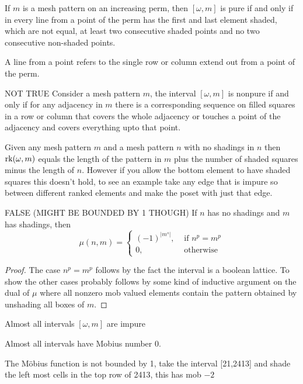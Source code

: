 \documentclass[11pt,a4paper,oneside]{article}
\begin{document}
\begin{conj}
If $m$ is a mesh pattern on an increasing perm, then $[\omega,m]$ is pure if and only if in every line from a point of the perm has the first and last element shaded, which are not equal, at least two consecutive shaded points and no two consecutive non-shaded points. 
\end{conj}

A line from a point refers to the single row or column extend out from a point of the perm.

\begin{conj}NOT TRUE
Consider a mesh pattern $m$, the interval $[\omega,m]$ is nonpure if and only if for any adjacency in $m$ there is a corresponding sequence on filled squares in a row or column that covers the whole adjacency or touches a point of the adjacency and covers everything upto that point.
\end{conj}


Given any mesh pattern $m$ and a mesh pattern $n$ with no shadings in $n$ then $\operatorname{\textrm{rk}}(\omega,m)$ equals the length of the pattern in $m$ plus the number of shaded squares minus the length of $n$. However if you allow the bottom element to have shaded squares this doesn't hold, to see an example take any edge that is impure so between different ranked elements and make the poset with just that edge.

\begin{conj}FALSE (MIGHT BE BOUNDED BY 1 THOUGH)
If $n$ has no shadings and $m$ has shadings, then 
$$\mu(n,m)=\begin{cases}(-1)^{|m^s|},&\mbox{ if }n^p=m^p\\0,&\mbox{ otherwise}\end{cases}$$
\begin{proof}
The case $n^p=m^p$ follows by the fact the interval is a boolean lattice. To show the other cases probably follows by some kind of inductive argument on the dual of $\mu$ where all nonzero mob valued elements contain the pattern obtained by unshading all boxes of $m$.
\end{proof}
\end{conj}

\begin{conj}
Almost all intervals $[\omega,m]$ are impure
\end{conj}
\begin{conj}
Almost all intervals have Mobius number 0.
\end{conj}

The M\"obius function is not bounded by 1, take the interval [21,2413] and shade the left most cells in the top row of 2413, this has mob $-2$
\end{document}
